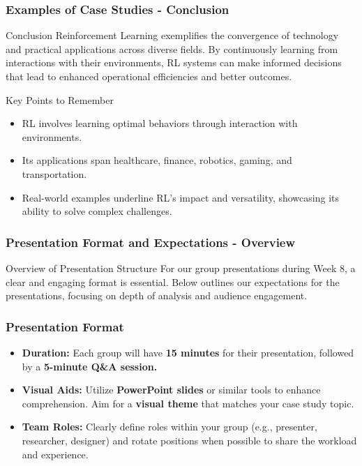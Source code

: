 \documentclass[aspectratio=169]{beamer}
\begin{document}
\begin{frame}[fragile]
    \frametitle{Examples of Case Studies - Conclusion}
    \begin{block}{Conclusion}
        Reinforcement Learning exemplifies the convergence of technology and practical applications across diverse fields. By continuously learning from interactions with their environments, RL systems can make informed decisions that lead to enhanced operational efficiencies and better outcomes.
    \end{block}
    
    \begin{block}{Key Points to Remember}
        \begin{itemize}
            \item RL involves learning optimal behaviors through interaction with environments.
            \item Its applications span healthcare, finance, robotics, gaming, and transportation.
            \item Real-world examples underline RL's impact and versatility, showcasing its ability to solve complex challenges.
        \end{itemize}
    \end{block}
\end{frame}

\begin{frame}[fragile]
    \frametitle{Presentation Format and Expectations - Overview}
    \begin{block}{Overview of Presentation Structure}
    For our group presentations during Week 8, a clear and engaging format is essential. Below outlines our expectations for the presentations, focusing on depth of analysis and audience engagement.
    \end{block}
\end{frame}

\begin{frame}[fragile]
    \frametitle{Presentation Format}
    \begin{itemize}
        \item \textbf{Duration:} Each group will have \textbf{15 minutes} for their presentation, followed by a \textbf{5-minute Q\&A session.}
        \item \textbf{Visual Aids:} Utilize \textbf{PowerPoint slides} or similar tools to enhance comprehension. Aim for a \textbf{visual theme} that matches your case study topic.
        \item \textbf{Team Roles:} Clearly define roles within your group (e.g., presenter, researcher, designer) and rotate positions when possible to share the workload and experience.
    \end{itemize}
\end{frame}
\end{document}
